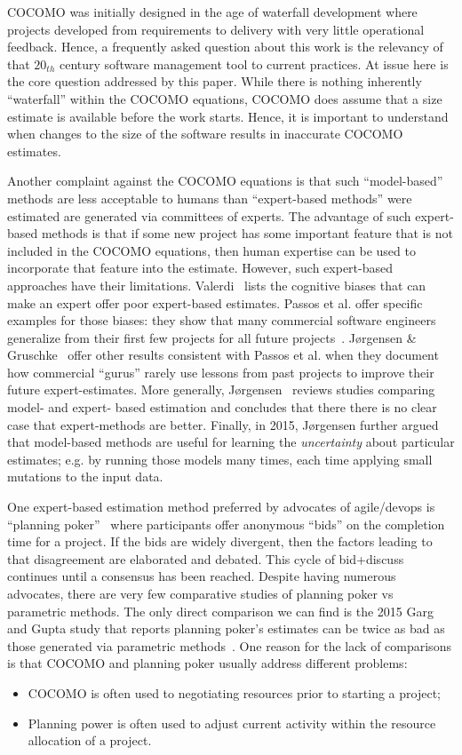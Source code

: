 \documentclass[final,twocolumn,5p]{elsarticle}
\newcommand{\bi}{\begin{itemize}[leftmargin=0.4cm]}
\newcommand{\ei}{\end{itemize}}
\theoremstyle{break}
\begin{document}
 
COCOMO was initially designed in the age of
waterfall development where projects developed from
requirements to delivery with very little
operational feedback.  Hence, a frequently asked
question about this work is the relevancy of that
$20_{th}$ century software management tool to
current practices.  At issue here is the core
question addressed by this paper.  While there is
nothing inherently ``waterfall'' within the COCOMO
equations, COCOMO does assume that a size estimate
is available before the work starts.  Hence, it is
important to understand when changes to the size of
the software results in inaccurate COCOMO estimates.

Another complaint against the COCOMO equations is
that such ``model-based'' methods are less
acceptable to humans than ``expert-based methods''
were estimated are generated via committees of
experts. The advantage of such expert-based methods
is that if some new project has some important
feature that is not included in the COCOMO
equations, then human expertise can be used to
incorporate that feature into the estimate.
However,
such expert-based approaches have their limitations.
Valerdi~\cite{valerdi11} lists the cognitive biases
that can make an expert offer poor expert-based estimates.
Passos et al. offer specific examples for those
biases: they show that many commercial software
engineers generalize from their first few projects
for all future projects~\cite{passos11}.  J{\o}rgensen
\& Gruschke~\cite{jorgensen09} offer other results
consistent with Passos et al.  when they document
how commercial ``gurus'' rarely use lessons from
past projects to improve their future
expert-estimates.  More generally,
J{\o}rgensen~\cite{Jorgensen2004} reviews studies
comparing model- and expert- based estimation and
concludes that there there is no clear case that
expert-methods are better.  Finally, in 2015,
J{\o}rgensen further argued~\cite{jorg15} that
model-based methods are useful for learning the {\em
  uncertainty} about particular estimates; e.g.  by
running those models many times, each time applying
small mutations to the input data.

 One expert-based estimation method preferred by advocates of
 agile/devops is ``planning poker''~\cite{molokk08}
 where participants offer anonymous ``bids'' on the
 completion time for a project. If the bids are
 widely divergent, then the factors leading to that
 disagreement are elaborated and debated. This cycle
 of bid+discuss continues until a consensus has been
 reached.  Despite having numerous advocates,
 there are very few comparative studies of planning
 poker vs parametric methods. The only direct
 comparison we can find is the 2015 Garg and Gupta
 study that reports planning poker's estimates can be
 twice as bad as those generated via parametric
 methods~\cite{garg15}. One reason for the lack of
 comparisons is that COCOMO and planning poker
 usually address different problems: \bi
\item COCOMO is often used to negotiating resources prior to starting a project;
\item Planning power is often used to adjust current activity within the resource allocation of a project.
  \ei
\end{document}
